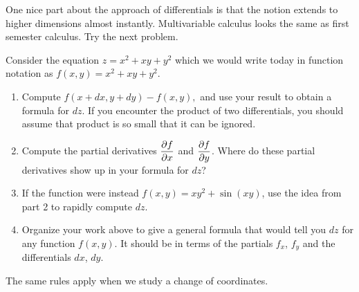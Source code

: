 One nice part about the approach of differentials is that the notion extends to higher dimensions almost instantly.  Multivariable calculus looks the same as first semester calculus. Try the next problem.




\begin{problem}
 Consider the equation $z = x^2+xy+y^2$ which we would write today in function notation as $f(x,y)=x^2+xy+y^2$.
\begin{enumerate}
 \item {}%
Compute $f(x+dx,y+dy)-f(x,y),$ and use your result to obtain a formula for $dz$. If you encounter the product of two differentials, you should assume that product is so small that it can be ignored. 
 \item Compute the partial derivatives $\displaystyle\frac{\partial f}{\partial x}$ and $\displaystyle\frac{\partial f}{\partial y}$. Where do these partial derivatives show up in your formula for $dz$?
 \item If the function were instead $f(x,y) = xy^2+\sin(xy)$, use the idea from part 2 to rapidly compute $dz$. 
 \item Organize your work above to give a general formula that would tell you $dz$ for any function $f(x,y)$. It should be in terms of the partials $f_x$, $f_y$ and the differentials $dx$, $dy$. 
\end{enumerate}
\end{problem}



The same rules apply when we study a change of coordinates.




